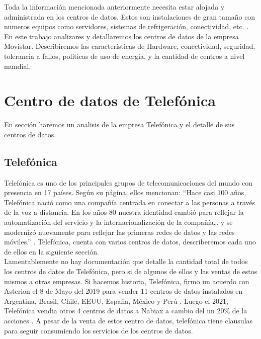 \documentclass{article}
\begin{document}
Toda la información mencionada anteriormente necesita estar alojada  y administrada en los centros de datos. Estos son instalaciones de  gran tamaño con numeros equipos como servidores, sistemas de refrigeración, conectividad, etc. \citep{khan2015handbook}.\\

En este trabajo analizares y detallaremos los centros de datos de la empresa Movistar. Describiremos las características de Hardware, conectividad, seguridad, tolerancia a fallos, políticas de uso de energia, y la cantidad de centros a nivel mundial.


\section{Centro de datos de Telefónica }

En sección haremos un analisis de la empresa Telefónica y el detalle de sus centros de datos.

\subsection{Telefónica}

Telefónica es uno de los principales grupos de telecomunicaciones del mundo con presencia en 17 países. Según su página, ellos mencionan: ``Hace casi 100 años, Telefónica nació como una compañía centrada en conectar a las personas a través de la voz a distancia. En los años 80 nuestra identidad cambió para reflejar la automatización del servicio y la internacionalización de la compañía… y se modernizó nuevamente para reflejar las primeras redes de datos y las redes móviles.'' \citep{telefonica2021}. Telefónica, cuenta con varios centros de datos, describeremos cada uno de ellos en la siguiente sección. \\

Lamentablemente no hay documentación que detalle la cantidad total de todos los centros de datos de Telefónica, pero si de algunos de ellos y las ventas de estos mismos a otras empresas. Si hacemos historia, Telefónica, firmo un acuerdo con Asterion el 8 de Mayo del 2019 para vender 11 centros de datos instalados en Argentina, Brasil, Chile, EEUU, España, México y Perú \citep{telefonica2019}. Luego el 2021, Telefónica vendia otros 4 centros de datos a Nabiax a cambio del un 20\% de la acciones \citep{Invertia2019}. A pesar de la venta de estos centro de datos, telefónica tiene clausulas para seguir consumiendo los servicios de los centros de datos.
\end{document}
